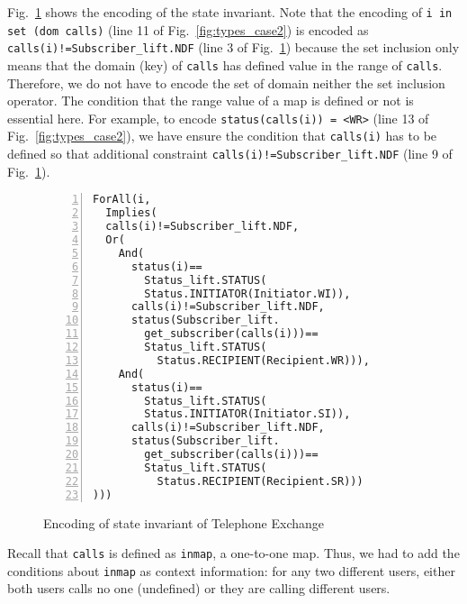 Fig.~\ref{fig:encode_state_inv_case2} shows the encoding of the state invariant. Note that the encoding of {\tt i in set (dom calls)} (line 11 of Fig.~\ref{fig:types_case2}) is encoded as {\tt calls(i)!=Subscriber\_lift.NDF} (line 3 of Fig.~\ref{fig:encode_state_inv_case2}) because the set inclusion only means that the domain (key) of {\tt calls} has defined value in the range of {\tt calls}. Therefore, we do not have to encode the set of domain neither the set inclusion operator. The condition that the range value of a map is defined or not is essential here. For example, to encode {\tt status(calls(i)) = <WR>} (line 13 of Fig.~\ref{fig:types_case2}), we have ensure the condition that {\tt calls(i)} has to be defined so that additional constraint {\tt calls(i)!=Subscriber\_lift.NDF} (line 9 of Fig.~\ref{fig:encode_state_inv_case2}).


\begin{figure}[t]
\begin{center}
\begin{mdframed}[roundcorner=5pt,shadow=true]
\begin{Verbatim}[fontsize=\small,numbers=left]
ForAll(i,
  Implies(
  calls(i)!=Subscriber_lift.NDF,
  Or(
    And(
      status(i)==
        Status_lift.STATUS(
        Status.INITIATOR(Initiator.WI)),
	  calls(i)!=Subscriber_lift.NDF,
      status(Subscriber_lift.
        get_subscriber(calls(i)))==
        Status_lift.STATUS(
          Status.RECIPIENT(Recipient.WR))),
    And(
      status(i)==
        Status_lift.STATUS(
        Status.INITIATOR(Initiator.SI)),
      calls(i)!=Subscriber_lift.NDF,
      status(Subscriber_lift.
        get_subscriber(calls(i)))==
        Status_lift.STATUS(
          Status.RECIPIENT(Recipient.SR)))
)))
\end{Verbatim}
\end{mdframed}
\vspace{-10pt}
\caption{Encoding of state invariant of Telephone Exchange}
\label{fig:encode_state_inv_case2}
\end{center}
\end{figure}

Recall that {\tt calls} is defined as {\tt inmap}, a one-to-one map. Thus, we had to add  the conditions about {\tt inmap} as context information: for any two different users, either both users calls no one (undefined) or they are calling different users.

